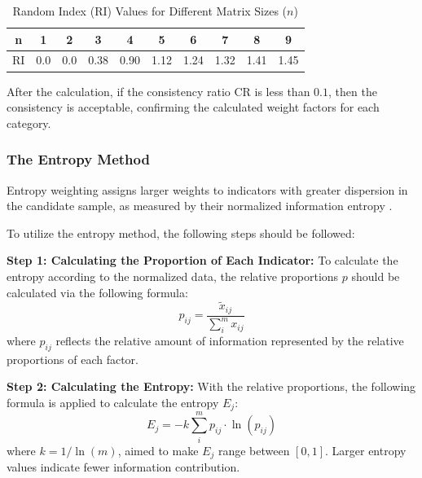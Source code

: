 \documentclass{mcmthesis}
\begin{document}
\begin{table}[!h]
\begin{center}

\caption{Random Index ($\text{RI}$) Values for Different Matrix Sizes ($n$)}
\label{tab:AHP_RI_values}
\setlength{\tabcolsep}{12pt} 
\begin{tabular}{cccccccccc}
\toprule
n & 1 & 2 & 3 & 4 & 5 & 6 & 7 & 8 & 9 \\
\midrule
RI & 0.0 & 0.0 & 0.38 & 0.90 & 1.12 & 1.24 & 1.32 & 1.41 & 1.45 \\
\bottomrule
\end{tabular}
\end{center}
\end{table}

After the calculation, if the consistency ratio $\text{CR}$ is less than $0.1$, then the consistency is acceptable, confirming the calculated weight factors for each category. 

\subsubsection{The Entropy Method} \label{subsubsec:entropy}

Entropy weighting assigns larger weights to indicators with greater dispersion in the candidate sample, as measured by their normalized information entropy \cite{Entropy}.

To utilize the entropy method, the following steps should be followed: 

\textbf{Step 1: Calculating the Proportion of Each Indicator:} To calculate the entropy according to the normalized data, the relative proportions $p$ should be calculated via the following formula:  
\begin{equation} \label{eq:entropy_proportions}
    p_{ij} = \frac{\tilde{x}_{ij}}{\sum^m_i x_{ij}}
\end{equation}
where $p_{ij}$ reflects the relative amount of information represented by the relative proportions of each factor.

\textbf{Step 2: Calculating the Entropy:} With the relative proportions, the following formula is applied to calculate the entropy $E_j$: 
\begin{equation} \label{eq:entropy_entropy_values}
    E_j = -k \sum^m_i p_{ij} \cdot \ln(p_{ij}) 
\end{equation}
where $k = 1/\ln (m)$, aimed to make $E_j$ range between $[0,1]$. Larger entropy values indicate fewer information contribution.
\end{document}
